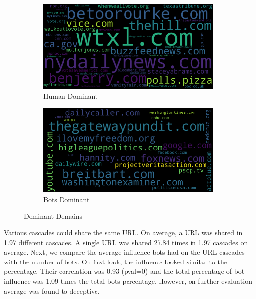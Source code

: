 \documentclass[letterpaper]{article}
\begin{document}
\begin{figure}
    \centering
    \captionsetup{justification=centering}

    \begin{subfigure}[b]{0.4\linewidth}
      \includegraphics[width=\linewidth]{images/mostly_human_urls.png}
      \caption{Human Dominant}
    \end{subfigure}
    \begin{subfigure}[b]{0.4\linewidth}
      \includegraphics[width=\linewidth]{images/mostly_bots_urls.png}
      \caption{Bots Dominant}
    \end{subfigure}
    \caption{Dominant Domains}
\end{figure}

Various cascades could share the same URL. On average, a URL was shared in 1.97 different cascades. A single URL was shared 27.84 times in 1.97 cascades on average.
Next, we compare the average influence bots had on the URL cascades with the number of bots. On first look, the influence looked similar to the percentage. Their correlation was 0.93 
(pval=0) and the total percentage of bot influence was 1.09 times the total bots percentage. However, on further evaluation average was found to deceptive.
\end{document}
